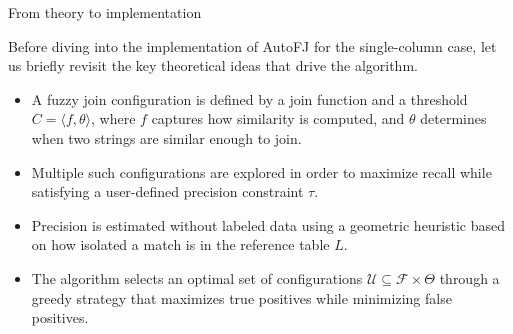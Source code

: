 \documentclass[8pt]{beamer} %
\begin{document}
\begin{frame}{From theory to implementation}
	
	Before diving into the implementation of AutoFJ for the single-column case, let us briefly revisit the key theoretical ideas that drive the algorithm. 
	
	\begin{itemize}
		\item 	A fuzzy join configuration is defined by a join function and a threshold \( C = \langle f, \theta \rangle \), where \( f \) captures how similarity is computed, and \( \theta \) determines when two strings are similar enough to join.
		
		\item Multiple such configurations are explored in order to maximize recall while satisfying a user-defined precision constraint \( \tau \).
		
		\item Precision is estimated without labeled data using a geometric heuristic based on how isolated a match is in the reference table \( L \). 
		
		\item  The algorithm selects an optimal set of configurations \( \mathcal{U} \subseteq \mathcal{F} \times \Theta \) through a greedy strategy that maximizes true positives while minimizing false positives.
	
	\end{itemize}
	
 
	
\end{frame}
\end{document}
